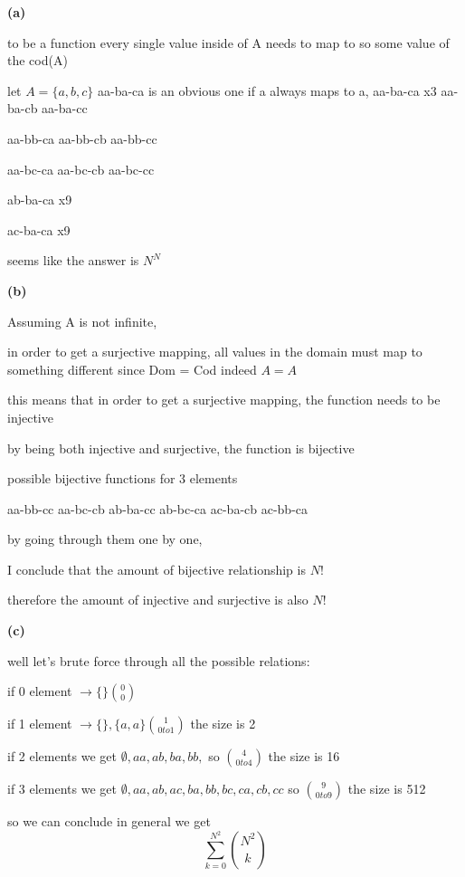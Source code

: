 \documentclass[12pts,A4]{article}
\begin{document}
\begin{flushleft}
    \textbf{(a)}


    to be a function every single value inside of A needs to map to so
    some value of the cod(A)

    let $A = \{ a,b,c \}$
    aa-ba-ca is an obvious one
    if a always maps to a,
    aa-ba-ca x3
    aa-ba-cb
    aa-ba-cc

    aa-bb-ca
    aa-bb-cb
    aa-bb-cc
    
    aa-bc-ca
    aa-bc-cb
    aa-bc-cc
    

    ab-ba-ca
    x9

    ac-ba-ca
    x9
    
    seems like the answer is $N^{N}$
    \bigskip

    \textbf{(b)}

    Assuming A is not infinite,


    in order to get a surjective mapping, all values in the domain
    must map to something different since Dom = Cod indeed $A = A$

    this means that in order to get a surjective mapping, the function
    needs to be injective
    
    by being both injective and surjective, the function is bijective

    possible bijective functions for 3 elements

    aa-bb-cc aa-bc-cb ab-ba-cc ab-bc-ca ac-ba-cb ac-bb-ca 

    by going through them one by one, 
    
    I conclude that the amount of bijective relationship is $N!$

    therefore the amount of injective and surjective is also $N!$

    \bigskip
    
    \textbf{(c)}
    
    well let's brute force through all the possible relations:

    if 0 element $\rightarrow \{\} \binom{0}{0}$

    if 1 element $\rightarrow \{\} , \{a,a\} \binom{1} {0 to 1} $ the size is 2

    if 2 elements we get $ \emptyset , aa , ab, ba, bb, $ so $ \binom{4} {0 to 4} $ the size is 16

    if 3 elements we get $ \emptyset, aa , ab, ac, ba, bb, bc, ca, cb, cc $ so $ \binom{9} {0 to 9}$ the size is 512

    so we can conclude in general we get 
    $$\sum_{k=0}^{N^{2}} \binom{N^{2}} {k} $$ 


\end{flushleft}
\end{document}
